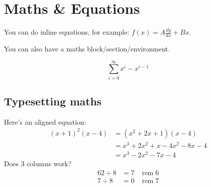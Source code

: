\documentclass[12pt,a4paper]{article}
\begin{document}
    \section{Maths \& Equations}
    \label{sec:maths}
    You can do inline equations, for example: $f(x)=A\frac{dy}{dx}+Bx$.
    
You can also have a maths block/section/environment.
    
    \begin{equation*}
        \sum_{i=0}^{\infty}x^i-x^{i-1}
    \end{equation*}

    \subsection{Typesetting maths}
    Here's an aligned equation:
    \begin{align*}
        (x+1)^2(x-4)    &= (x^2+2x+1)(x-4) \\
                        &= x^3+2x^2+x-4x^2-8x-4 \\
                        &= x^3-2x^2-7x-4
    \end{align*}
    Does 3 columns work?
    \begin{align*}
        62 \div 8  &= 7 & \operatorname{rem} 6 \\
        7 \div 8   &= 0 & \operatorname{rem} 7
    \end{align*}
    
\end{document}
